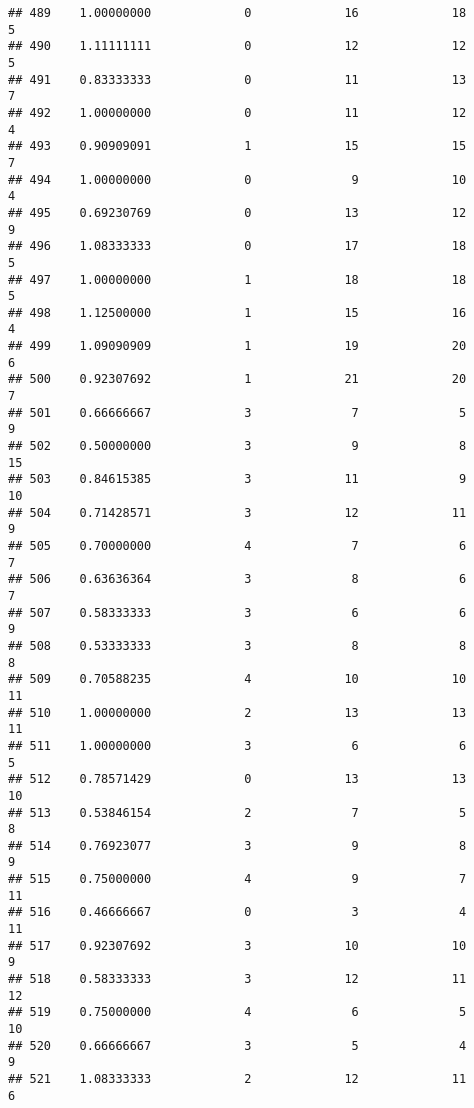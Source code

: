 \documentclass[
]{article}
\begin{document}
\begin{verbatim}
## 489    1.00000000             0             16             18              5
## 490    1.11111111             0             12             12              5
## 491    0.83333333             0             11             13              7
## 492    1.00000000             0             11             12              4
## 493    0.90909091             1             15             15              7
## 494    1.00000000             0              9             10              4
## 495    0.69230769             0             13             12              9
## 496    1.08333333             0             17             18              5
## 497    1.00000000             1             18             18              5
## 498    1.12500000             1             15             16              4
## 499    1.09090909             1             19             20              6
## 500    0.92307692             1             21             20              7
## 501    0.66666667             3              7              5              9
## 502    0.50000000             3              9              8             15
## 503    0.84615385             3             11              9             10
## 504    0.71428571             3             12             11              9
## 505    0.70000000             4              7              6              7
## 506    0.63636364             3              8              6              7
## 507    0.58333333             3              6              6              9
## 508    0.53333333             3              8              8              8
## 509    0.70588235             4             10             10             11
## 510    1.00000000             2             13             13             11
## 511    1.00000000             3              6              6              5
## 512    0.78571429             0             13             13             10
## 513    0.53846154             2              7              5              8
## 514    0.76923077             3              9              8              9
## 515    0.75000000             4              9              7             11
## 516    0.46666667             0              3              4             11
## 517    0.92307692             3             10             10              9
## 518    0.58333333             3             12             11             12
## 519    0.75000000             4              6              5             10
## 520    0.66666667             3              5              4              9
## 521    1.08333333             2             12             11              6

\end{verbatim}
\end{document}

